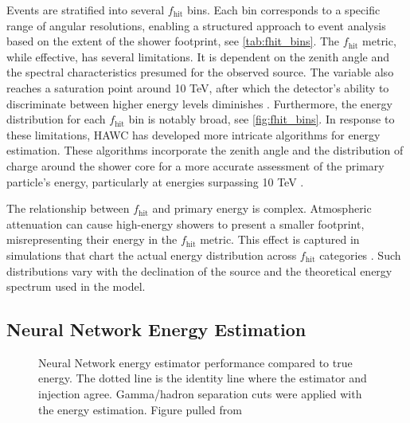 Events are stratified into several $f_{\text{hit}}$ bins.
Each bin corresponds to a specific range of angular resolutions, enabling a structured approach to event analysis based on the extent of the shower footprint, see \cref{tab:fhit_bins}.
The $f_{\text{hit}}$ metric, while effective, has several limitations.
It is dependent on the zenith angle and the spectral characteristics presumed for the observed source.
The variable also reaches a saturation point around 10 TeV, after which the detector's ability to discriminate between higher energy levels diminishes \cite{Abeysekara_2017}.
Furthermore, the energy distribution for each $f_{\text{hit}}$ bin is notably broad, see \cref{fig:fhit_bins}.
In response to these limitations, HAWC has developed more intricate algorithms for energy estimation.
These algorithms incorporate the zenith angle and the distribution of charge around the shower core for a more accurate assessment of the primary particle's energy, particularly at energies surpassing 10 TeV \cite{wcd_Sensitivity}.

The relationship between $f_{\text{hit}}$ and primary energy is complex.
Atmospheric attenuation can cause high-energy showers to present a smaller footprint, misrepresenting their energy in the $f_{\text{hit}}$ metric.
This effect is captured in simulations that chart the actual energy distribution across $f_{\text{hit}}$ categories \cite{wcd_Sensitivity}.
Such distributions vary with the declination of the source and the theoretical energy spectrum used in the model.

\subsection{Neural Network Energy Estimation}\label{sec:hawc_nn}

\begin{figure}
    \caption{Neural Network energy estimator performance compared to true energy. The dotted line is the identity line where the estimator and injection agree. Gamma/hadron separation cuts were applied with the energy estimation. Figure pulled from \cite{100TEV_Crab_HAWC}}
    \label{fig:NN_performance}
\end{figure}


